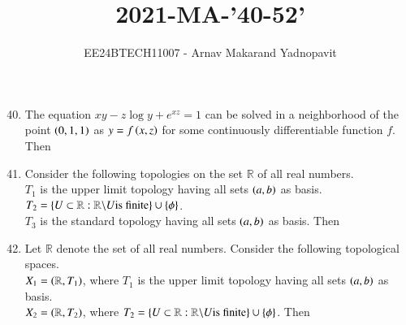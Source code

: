 \documentclass[journal,12pt,onecolumn]{IEEEtran}
\theoremstyle{remark}
\begin{document}
\title{2021-MA-'40-52'}
\author{EE24BTECH11007 - Arnav Makarand Yadnopavit}
\maketitle
\renewcommand{\thefigure}{\theenumi}
\renewcommand{\thetable}{\theenumi}
\begin{enumerate}
\setcounter{enumi}{39}
\item The equation $xy-z\log{y}+e^{xz} = 1$ can be solved in a neighborhood of the point $\left(0, 1, 1\right)$ as $y = f\left(x, z\right)$ for some continuously differentiable function $f$. Then
\begin{enumerate}
\end{enumerate}
\item Consider the following topologies on the set $\mathbb{R}$ of all real numbers.\\
$T_1$ is the upper limit topology having all sets $\left(a, b\right)$ as basis.\\
$T_2=\left\{U\subset \mathbb{R}: \mathbb{R}\backslash U \text{is finite}\right\}\cup \left\{\phi\right\}$.\\
$T_3$ is the standard topology having all sets $\left(a, b\right)$ as basis. Then
\begin{enumerate}
\end{enumerate}
\item Let $\mathbb{R}$ denote the set of all real numbers. Consider the following topological spaces.\\
$X_1 = \left(\mathbb{R}, T_1\right)$, where $T_1$ is the upper limit topology having all sets $\left(a, b\right)$ as basis.\\
$X_2=\left(\mathbb{R}, T_2\right)$, where $T_2=\left\{U\subset \mathbb{R}: \mathbb{R}\backslash U \text{is finite}\right\} \cup \left\{\phi\right\}$. Then

\end{enumerate}
\end{document}
